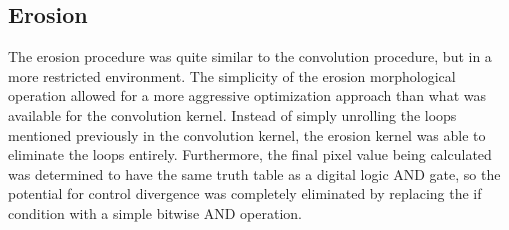 \documentclass[conference]{IEEEtran}
\begin{document}
      \subsection{Erosion}
         The erosion procedure was quite similar to the convolution procedure, but in a more restricted environment. The simplicity of the erosion morphological operation allowed for a more aggressive optimization approach than what was available for the convolution kernel. Instead of simply unrolling the loops mentioned previously in the convolution kernel, the erosion kernel was able to eliminate the loops entirely. Furthermore, the final pixel value being calculated was determined to have the same truth table as a digital logic AND gate, so the potential for control divergence was completely eliminated by replacing the if condition with a simple bitwise AND operation.
\end{document}
